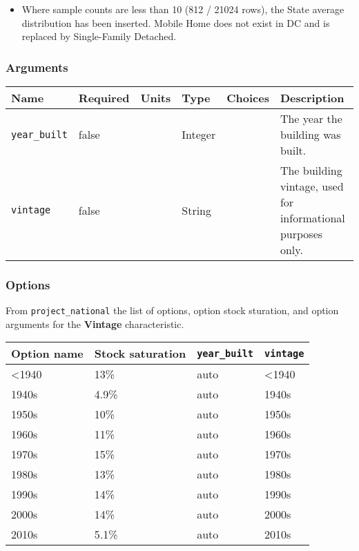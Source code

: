 \begin{itemize}
 
\item
  Where sample counts are less than 10 (812 / 21024 rows), the State
  average distribution has been inserted. \textquotesingle Mobile
  Home\textquotesingle{} does not exist in DC and is replaced by
  \textquotesingle Single-Family Detached\textquotesingle.
\end{itemize}

\subsubsection{Arguments}\label{arguments-102}

\begin{longtable}[]{@{}llllll@{}}
\toprule\noalign{}
Name & Required & Units & Type & Choices & Description \\
\midrule\noalign{}
\endhead
\bottomrule\noalign{}
\endlastfoot
\texttt{year\_built} & false & & Integer & & The year the building was
built. \\
\texttt{vintage} & false & & String & & The building vintage, used for
informational purposes only. \\
\end{longtable}

\subsubsection{Options}\label{options-147}

From \texttt{project\_national} the list of options, option stock
sturation, and option arguments for the \textbf{Vintage} characteristic.

\begin{longtable}[]{@{}llll@{}}
\toprule\noalign{}
Option name & Stock saturation & \texttt{year\_built} &
\texttt{vintage} \\
\midrule\noalign{}
\endhead
\bottomrule\noalign{}
\endlastfoot
\textless1940 & 13\% & auto & \textless1940 \\
1940s & 4.9\% & auto & 1940s \\
1950s & 10\% & auto & 1950s \\
1960s & 11\% & auto & 1960s \\
1970s & 15\% & auto & 1970s \\
1980s & 13\% & auto & 1980s \\
1990s & 14\% & auto & 1990s \\
2000s & 14\% & auto & 2000s \\
2010s & 5.1\% & auto & 2010s \\
\end{longtable}

